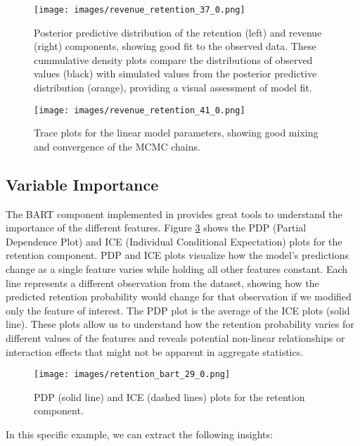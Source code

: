 \documentclass[11pt]{amsart}
\theoremstyle{definition}
\begin{document}
\begin{figure}
    \centering
    \texttt{[image: images/revenue\_retention\_37\_0.png]}
    \caption{Posterior predictive distribution of the retention (left) and revenue (right) components, showing good fit to
        the observed data. These cummulative density plots compare the distributions of observed values (black) with simulated
        values from the posterior predictive distribution (orange), providing a visual assessment of model fit.}
    \label{fig:posterior_predictive}
\end{figure}

\begin{figure}
    \centering
    \texttt{[image: images/revenue\_retention\_41\_0.png]}
    \caption{Trace plots for the linear model parameters, showing good mixing and convergence of the MCMC chains.}
    \label{fig:trace}
\end{figure}

\subsection{Variable Importance}

The BART component implemented in \cite{quiroga2022bart} provides great tools to understand the importance of the different
features. Figure \ref{fig:ice_plot} shows the PDP (Partial Dependence Plot) and ICE (Individual Conditional Expectation)
plots for the retention component. PDP and ICE plots visualize how the model's predictions change as a single feature varies
while holding all other features constant. Each line represents a different observation from the dataset, showing how the
predicted retention probability would change for that observation if we modified only the feature of interest. The PDP
plot is the average of the ICE plots (solid line). These plots allow us to understand how the retention probability varies
for different values of the features and reveals potential non-linear relationships or interaction effects that might not
be apparent in aggregate statistics. \\

\begin{figure}
    \centering
    \texttt{[image: images/retention\_bart\_29\_0.png]}
    \caption{PDP (solid line) and ICE (dashed lines) plots for the retention component.}
    \label{fig:ice_plot}
\end{figure}

In this specific example, we can extract the following insights:
\end{document}
